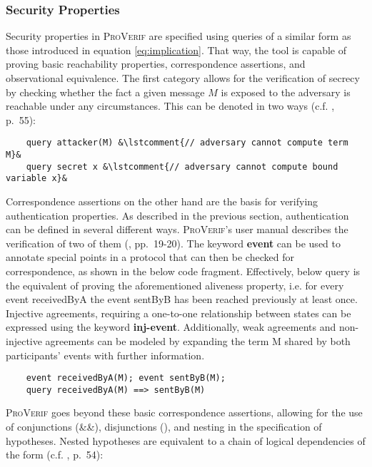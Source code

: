 \subsubsection{Security Properties}

Security properties in \textsc{ProVerif} are specified using queries of a similar form as those introduced in equation \ref{eq:implication}.
That way, the tool is capable of proving basic reachability properties, correspondence assertions, and observational equivalence.
The first category allows for the verification of secrecy by checking whether the fact a given message $M$ is exposed to the adversary is reachable under any circumstances.
This can be denoted in two ways (c.f. \cite{blanchet2020proverif}, p.~55):

\begin{lstlisting}
    query attacker(M) &\lstcomment{// adversary cannot compute term M}&
    query secret x &\lstcomment{// adversary cannot compute bound variable x}&
\end{lstlisting}

Correspondence assertions on the other hand are the basis for verifying authentication properties.
As described in the previous section, authentication can be defined in several different ways.
\textsc{ProVerif}'s user manual describes the verification of two of them (\cite{blanchet2020proverif}, pp.~19-20).
The keyword \textsf{\textbf{event}} can be used to annotate special points in a protocol that can then be checked for correspondence, as shown in the below code fragment.
Effectively, below query is the equivalent of proving the aforementioned aliveness property, i.e. for every event \textsf{receivedByA} the event \textsf{sentByB} has been reached previously at least once.
Injective agreements, requiring a one-to-one relationship between states can be expressed using the keyword \textsf{\textbf{inj-event}}.
Additionally, weak agreements and non-injective agreements can be modeled by expanding the term \textsf{M} shared by both participants' events with further information.

\begin{lstlisting}
    event receivedByA(M); event sentByB(M);
    query receivedByA(M) ==> sentByB(M)
\end{lstlisting}

\noindent
\textsc{ProVerif} goes beyond these basic correspondence assertions, allowing for the use of conjunctions (\textsf{\&\&}), disjunctions (\textsf{\textbar\textbar}), and nesting in the specification of hypotheses.
Nested hypotheses are equivalent to a chain of logical dependencies of the form (c.f. \cite{blanchet2020proverif}, p.~54):

